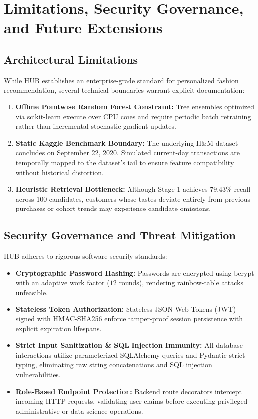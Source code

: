 \section{Limitations, Security Governance, and Future Extensions}

\subsection{Architectural Limitations}
While HUB establishes an enterprise-grade standard for personalized fashion recommendation, several technical boundaries warrant explicit documentation:
\begin{enumerate}
    \item \textbf{Offline Pointwise Random Forest Constraint:} Tree ensembles optimized via scikit-learn execute over CPU cores and require periodic batch retraining rather than incremental stochastic gradient updates.
    \item \textbf{Static Kaggle Benchmark Boundary:} The underlying H\&M dataset concludes on September 22, 2020. Simulated current-day transactions are temporally mapped to the dataset's tail to ensure feature compatibility without historical distortion.
    \item \textbf{Heuristic Retrieval Bottleneck:} Although Stage 1 achieves $79.43\%$ recall across 100 candidates, customers whose tastes deviate entirely from previous purchases or cohort trends may experience candidate omissions.
\end{enumerate}

\subsection{Security Governance and Threat Mitigation}
HUB adheres to rigorous software security standards:
\begin{itemize}
    \item \textbf{Cryptographic Password Hashing:} Passwords are encrypted using bcrypt with an adaptive work factor ($12$ rounds), rendering rainbow-table attacks unfeasible.
    \item \textbf{Stateless Token Authorization:} Stateless JSON Web Tokens (JWT) signed with HMAC-SHA256 enforce tamper-proof session persistence with explicit expiration lifespans.
    \item \textbf{Strict Input Sanitization \& SQL Injection Immunity:} All database interactions utilize parameterized SQLAlchemy queries and Pydantic strict typing, eliminating raw string concatenations and SQL injection vulnerabilities.
    \item \textbf{Role-Based Endpoint Protection:} Backend route decorators intercept incoming HTTP requests, validating user claims before executing privileged administrative or data science operations.
\end{itemize}

